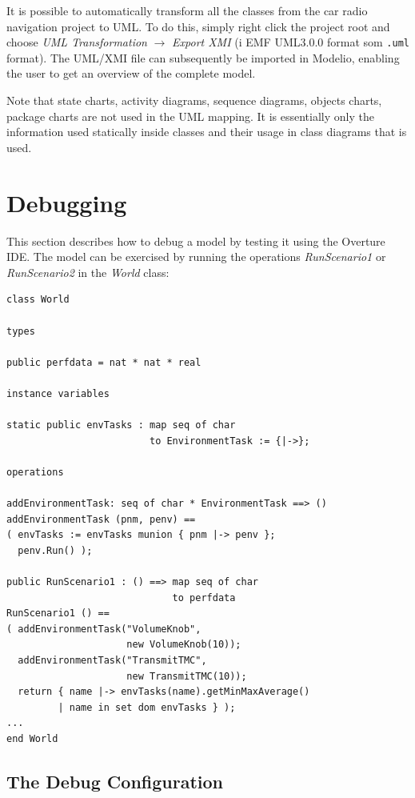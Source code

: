 It is possible to automatically transform all the classes from the car
radio navigation project to UML. To do this, simply right
click the project root and choose \emph{UML Transformation} $
\rightarrow $ \emph{Export XMI} (i EMF UML3.0.0 format som \texttt{.uml} 
format). The UML/XMI file can subsequently be
imported in Modelio, enabling the user to get an overview
of the complete model.

Note that state charts, activity
diagrams, sequence diagrams, objects charts, package charts are not
used in the UML mapping. It is essentially only the information used
statically inside classes and their usage in class diagrams that is
used.

\section{Debugging}\label{sec:debugging}

This section describes how to debug a model by testing it using the
Overture IDE. The model can be exercised by running the operations
\emph{RunScenario1} or \emph{RunScenario2} in the \emph{World} class:

\begin{lstlisting}
class World

types
  
public perfdata = nat * nat * real

instance variables

static public envTasks : map seq of char 
                         to EnvironmentTask := {|->};

operations

addEnvironmentTask: seq of char * EnvironmentTask ==> ()
addEnvironmentTask (pnm, penv) ==
( envTasks := envTasks munion { pnm |-> penv };
  penv.Run() );

public RunScenario1 : () ==> map seq of char 
                             to perfdata
RunScenario1 () ==
( addEnvironmentTask("VolumeKnob", 
                     new VolumeKnob(10));
  addEnvironmentTask("TransmitTMC", 
                     new TransmitTMC(10));
  return { name |-> envTasks(name).getMinMaxAverage() 
         | name in set dom envTasks } );
...
end World
\end{lstlisting}

\subsection{The Debug Configuration}\label{sec:debugconfig}

